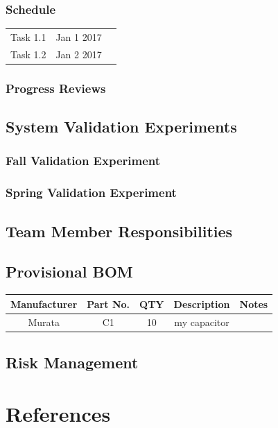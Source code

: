 \documentclass{article}
\begin{document}
\subsubsection{Schedule}
\begin{center}
\begin{tabular}{ |c|c|c| }
  \hline
    Task 1.1 & Jan 1 2017 \\
    Task 1.2 & Jan 2 2017 \\
  \hline
\end{tabular}
\end{center}

\subsubsection{Progress Reviews}

\subsection{System Validation Experiments}
\subsubsection{Fall Validation Experiment}
\subsubsection{Spring Validation Experiment}

\subsection{Team Member Responsibilities}
\subsection{Provisional BOM}
\begin{center}
\begin{tabular}{ |c|c|c|c|c| }
  \hline
    Manufacturer & Part No. & QTY & Description & Notes \\
    \hline 
    Murata & C1 & 10 & my capacitor &  \\
  \hline
\end{tabular}
\end{center}

\subsection{Risk Management}
\section{References}
\end{document}
